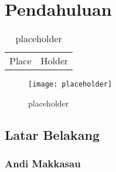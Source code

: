 \documentclass[../thesis.tex]{subfiles}
\begin{document}
\chapter{Pendahuluan}\label{chap:pendahuluan}

\lipsum[1-2] \citep{muhadjir1996metodologi}


\begin{table}[htpb]
    \centering
    \caption{placeholder}
    \label{tab:place}
    \begin{tabular}{l l}
    Place & Holder \\
    \end{tabular}
\end{table}

\begin{figure}[htpb]
    \centering
    \texttt{[image: placeholder]}
    \caption{placeholder}
    \label{fig:placeholder}
\end{figure}

\section{Latar Belakang}

\subsection{Andi Makkasau}

\end{document}
